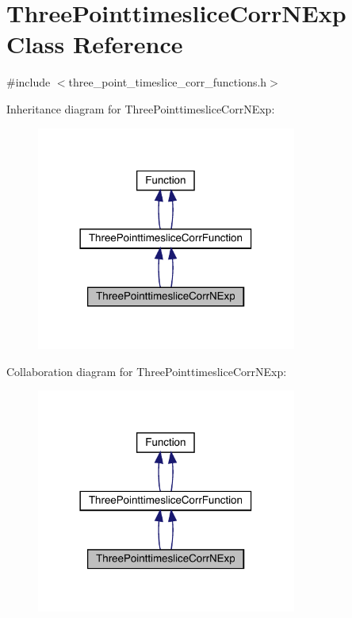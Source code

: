 \hypertarget{classThreePointtimesliceCorrNExp}{}\section{Three\+Pointtimeslice\+Corr\+N\+Exp Class Reference}
\label{classThreePointtimesliceCorrNExp}


{\ttfamily \#include $<$three\+\_\+point\+\_\+timeslice\+\_\+corr\+\_\+functions.\+h$>$}



Inheritance diagram for Three\+Pointtimeslice\+Corr\+N\+Exp\+:
\nopagebreak
\begin{figure}[H]
\begin{center}
\leavevmode
\includegraphics[width=242pt]{d6/d9d/classThreePointtimesliceCorrNExp__inherit__graph}
\end{center}
\end{figure}


Collaboration diagram for Three\+Pointtimeslice\+Corr\+N\+Exp\+:
\nopagebreak
\begin{figure}[H]
\begin{center}
\leavevmode
\includegraphics[width=242pt]{de/df9/classThreePointtimesliceCorrNExp__coll__graph}
\end{center}
\end{figure}
